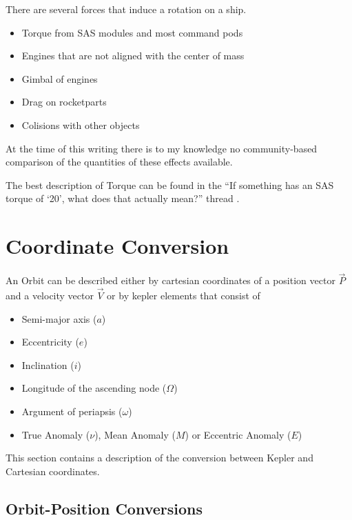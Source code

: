 \documentclass[11pt]{article}
\newcommand{\oa}[1]{\overrightarrow{#1}}
\newcommand{\Pos}{\oa{P}}
\newcommand{\Vel}{\oa{V}}
\begin{document}
There are several forces that induce a rotation on a ship.

\begin{itemize}
\item {} Torque from SAS modules and most command pods
\item Engines that are not aligned with the center of mass
\item {} Gimbal of engines
\item Drag on rocketparts
\item Colisions with other objects
\end{itemize}

At the time of this writing there is to my knowledge no
community-based comparison of the quantities of these effects
available.

The best description of Torque can be found in the ``If something has
an SAS torque of `20', what does that actually mean?'' thread
\cite{torque}.

\section{Coordinate Conversion}

An  Orbit can be described either by  cartesian coordinates of a position vector $\Pos$ and a
velocity vector $\Vel$ or by  kepler elements
\cite{Kepler} that consist of

\begin{itemize}
\item {} Semi-major axis ($a$)
\item {} Eccentricity ($e$)
\item {} Inclination ($i$)
\item {} Longitude of the ascending node ($\Omega$)
\item {} Argument of periapsis ($\omega$)
\item True Anomaly ($\nu$), Mean Anomaly ($M$) or Eccentric Anomaly ($E$)
\end{itemize}

This section contains a description of the conversion between Kepler
and Cartesian coordinates.

\subsection{Orbit-Position Conversions} \label{OrbitPositionConversions}
\end{document}
